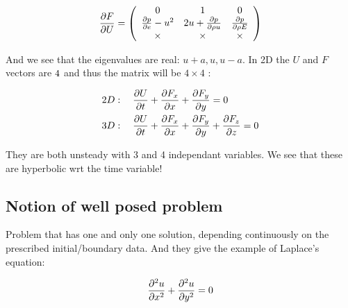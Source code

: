 \begin{equation}
\frac{\partial F}{\partial U} = \left( 
\begin{array}{ccc}
0 & 1 & 0\\
\frac{\partial p}{\partial e} - u^2 & 2u + \frac{\partial p}{\partial \rho u} & \frac{\partial p}{\partial \rho E}\\
\times & \times & \times
\end{array}
\right)
\end{equation}

And we see that the eigenvalues are real: $u+a, u , u-a$. In 2D the $U$ and $F$ vectors are $4\time 1$ and thus the matrix will be $4\times 4$ : 

\begin{equation}
\begin{aligned}
&2D: \quad \frac{\partial U}{\partial t} + \frac{\partial F_x}{\partial x}+ \frac{\partial F_y}{\partial y}  = 0\\
&3D: \quad \frac{\partial U}{\partial t} + \frac{\partial F_x}{\partial x}+ \frac{\partial F_y}{\partial y} + \frac{\partial F_z}{\partial z}  = 0
\end{aligned}
\end{equation}

They are both unsteady with 3 and 4 independant variables. We see that these are hyperbolic wrt the time variable! \\


\subsection{Notion of well posed problem}
Problem that has one and only one solution, depending continuously on the prescribed initial/boundary data. And they give the example of Laplace's equation: 

\begin{equation}
\frac{\partial ^2 u}{\partial x^2} + \frac{\partial ^2 u}{\partial y^2} = 0
\end{equation}


